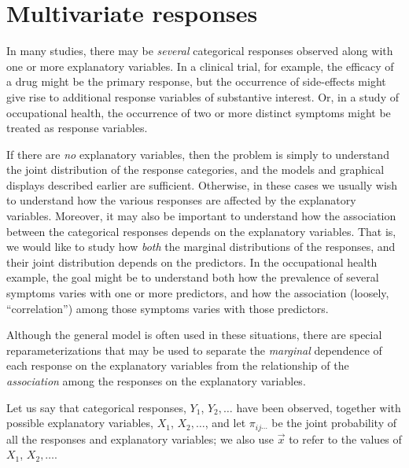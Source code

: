 \documentclass[11pt]{book}\usepackage[]{graphicx}\usepackage[]{color}
\begin{document}

\section{Multivariate responses}\label{sec:loglin-multiv}



In many studies, there may be \emph{several} categorical responses observed
along with one or more explanatory variables.
In a clinical trial, for example, the efficacy of a drug might be the
primary response, but the occurrence of side-effects might give rise to
additional response variables of substantive interest.
Or, in a study of occupational health, the occurrence of two or more
distinct symptoms might be treated as response variables.

If there are \emph{no} explanatory variables, then the problem is simply to
understand the joint distribution of the response categories,
and the \loglin models and graphical displays described earlier
are sufficient.
Otherwise,
in these cases we usually wish to understand how the various responses
are affected by the explanatory variables.
Moreover, it may also be important to understand how the association
between the categorical responses depends on the explanatory variables.
That is, we would like to study how \emph{both} the marginal distributions
of the responses, and their joint distribution depends on the
predictors.  In the occupational health example, the goal might be
to understand both how the prevalence of several symptoms varies with
one or more predictors, and how the association
(loosely, ``correlation'') among those symptoms varies with those predictors.

Although the general \loglin model is often used in these situations,
there are special reparameterizations that
may be used to separate the \emph{marginal} dependence of each response
on the explanatory variables from the relationship of the
\emph{association} among the responses on the explanatory variables.

Let us say that categorical responses, $Y_1$, $Y_2, \dots$ have been
observed, together with possible explanatory variables,
$X_1$, $X_2, \dots$,
and let $\pi_{ij\cdots}$ be the joint probability of all the responses
and explanatory variables;
we also use
$\vec{x}$ to refer to the values of $X_1$, $X_2, \dots$.
\end{document}
